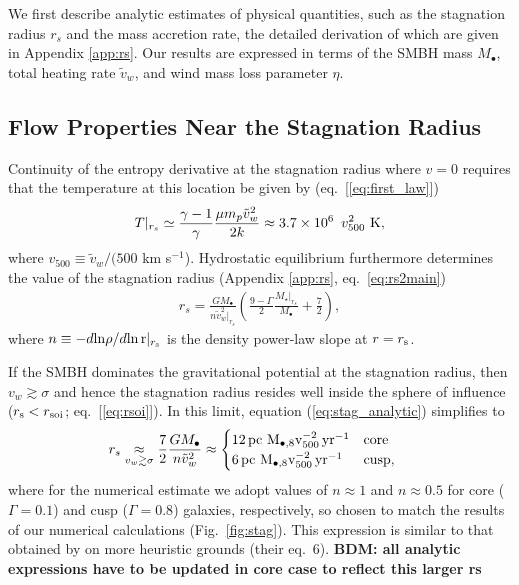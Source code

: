 \documentclass[usenatbib,fleqn]{mn2e}
\newcommand{\rs}{r_s}
\newcommand{\vw}{\tilde{v}_{w}}
\newcommand{\pc}{\rm pc}
\newcommand{\Mbh}[1][]{M_{\bullet#1}}
\newcommand{\Mbheight}{M_{\bullet,8}}
\newcommand{\pyear}{{\rm yr}^{-1}}
\begin{document}
We first describe analytic estimates of physical quantities, such as the stagnation radius $\rs$ and the mass accretion rate, the detailed derivation of which are given in Appendix \ref{app:rs}.  Our results are expressed in terms of the SMBH mass $M_{\bullet}$, total heating rate $\tilde{v}_{w}$, and wind mass loss parameter $\eta$.

\subsection{Flow Properties Near the Stagnation Radius}

Continuity of the entropy derivative at the stagnation radius where $v = 0$ requires that the temperature at this location be given by (eq.~[\ref{eq:first_law}])
\begin{align}
T|_{r_{s}} \simeq \frac{\gamma-1}{\gamma}\frac{\mu m_p \tilde{v}_{w}^{2}}{2k} \approx 3.7
\times 10^6\ \, v_{500}^2 \,\,{\rm K},
\label{eq:Tanalytic}
\end{align}
where $v_{500} \equiv \tilde{v}_{w}/(500$ km s$^{-1}$).  Hydrostatic equilibrium furthermore determines the value of the stagnation radius (Appendix \ref{app:rs}, eq.~\ref{eq:rs2main})
\begin{align}
\rs=\frac{G \Mbh}{n \vw^{2}|_{\rs}}\left(\frac{9-\Gamma}{2} \frac{M_{\star}|_{\rs}}{\Mbh} +\frac{7}{2}\right),
\label{eq:stag_analytic}
\end{align}
where $n \equiv -d{\rm ln}\rho/d{\rm ln\,r}|_{r_{\rm s}}$ is the density power-law slope at $r = r_{\rm s}$.  

If the SMBH dominates the gravitational potential at the stagnation radius, then $v_{w} \gtrsim \sigma$ and hence the stagnation radius resides well inside the sphere of influence ($r_{\rm s} < r_{\rm soi}$; eq.~[\ref{eq:rsoi}]).  In this limit, equation (\ref{eq:stag_analytic}) simplifies to
\begin{eqnarray}
  &\rs \underset{v_w \gtrsim \sigma}\approx \frac{7}{2}\frac{G \Mbh}{n \tilde{v}_{w}^{2}} \approx \begin{cases}
    12
 \, \pc \,\, \Mbheight v_{500}^{-2}\, \pyear& \text{core} \\
    6
 \, \pc \,\, \Mbheight v_{500}^{-2} \, \pyear  & \text{cusp}, 
  \end{cases}
  \label{eq:stag_simple}
\end{eqnarray}
where for the numerical estimate we adopt values of $n \approx 1$ and $n \approx 0.5$ for core ($\Gamma = 0.1$) and cusp ($\Gamma = 0.8$) galaxies, respectively, so chosen to match the results of our numerical calculations (Fig.~\ref{fig:stag}).  This expression is similar to that obtained by \citet{Volonteri+11} on more heuristic grounds (their eq.~6).  {\bf BDM: all analytic expressions have to be updated in core case to reflect this larger rs}
\end{document}
